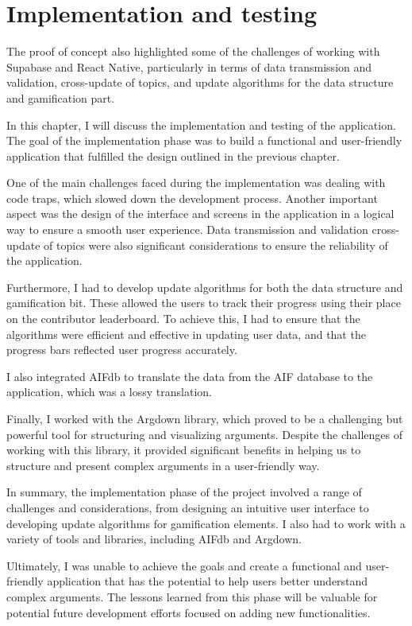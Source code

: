 \documentclass{article}
\begin{document}
\chapter{Implementation and testing}

The proof of concept also highlighted some of the challenges of working with Supabase and React Native, particularly in terms of data transmission and validation, cross-update of topics, and update algorithms for the data structure and gamification part.

In this chapter, I will discuss the implementation and testing of the application. The goal of the implementation phase was to build a functional and user-friendly application that fulfilled the design outlined in the previous chapter.

One of the main challenges faced during the implementation was dealing with code traps, which slowed down the development process. Another important aspect was the design of the interface and screens in the application in a logical way to ensure a smooth user experience. Data transmission and validation cross-update of topics were also significant considerations to ensure the reliability of the application.

Furthermore, I had to develop update algorithms for both the data structure and gamification bit. These allowed the users to track their progress using their place on the contributor leaderboard. To achieve this, I had to ensure that the algorithms were efficient and effective in updating user data, and that the progress bars reflected user progress accurately.

I also integrated AIFdb to translate the data from the AIF database to the application, which was a lossy translation.

Finally, I worked with the Argdown library, which proved to be a challenging but powerful tool for structuring and visualizing arguments. Despite the challenges of working with this library, it provided significant benefits in helping us to structure and present complex arguments in a user-friendly way.

In summary, the implementation phase of the project involved a range of challenges and considerations, from designing an intuitive user interface to developing update algorithms for gamification elements. I also had to work with a variety of tools and libraries, including AIFdb and Argdown. 

Ultimately, I was unable to achieve the goals and create a functional and user-friendly application that has the potential to help users better understand complex arguments. The lessons learned from this phase will be valuable for potential future development efforts focused on adding new functionalities.
\end{document}
